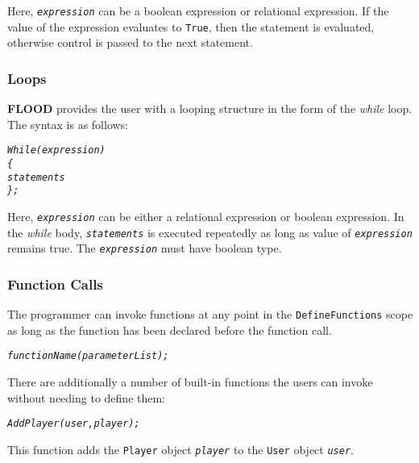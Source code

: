 \documentclass[12pt]{report}
\begin{document}
Here, \textit{\texttt{expression}} can be a boolean expression or relational expression. If the value of the expression evaluates to \texttt{True}, then the statement is evaluated, otherwise control is passed to the next statement.

\subsubsection{Loops}

\textbf{FLOOD} provides the user with a looping structure in the form of the \textit{while} loop. The syntax is as follows:

\begin{alltt}\begin{singlespace}
            \textit{While (expression)
            \{
                statements
            \};}\end{singlespace}
\end{alltt}

Here, \textit{\texttt{expression}} can be either a relational expression or boolean expression. In the \textit{while} body, \textit{\texttt{statements}} is executed repeatedly as long as value of \textit{\texttt{expression}} remains true. The \textit{\texttt{expression}} must have boolean type.

\subsubsection{Function Calls}

The programmer can invoke functions at any point in the \texttt{DefineFunctions} scope as long as the function has been declared before the function call. 

\begin{alltt}\begin{singlespace}
            \textit{functionName(parameterList);}\end{singlespace}
\end{alltt}

There are additionally a number of built-in functions the users can invoke without needing to define them:

\begin{alltt}\begin{singlespace}
            \textit{AddPlayer(user, player);}\end{singlespace}
\end{alltt}

This function adds the \texttt{Player} object \textit{\texttt{player}} to the \texttt{User} object \textit{\texttt{user}}.
\end{document}
